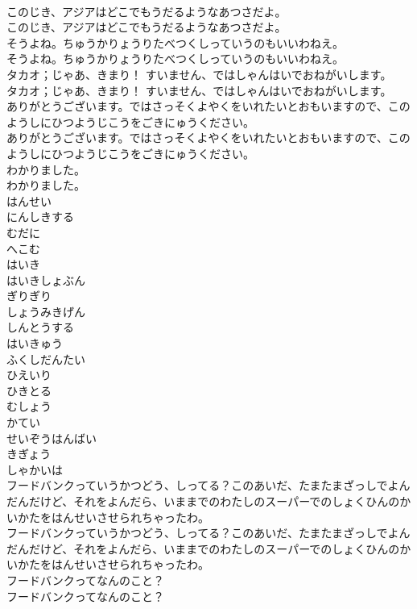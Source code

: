 \documentclass[8pt]{extreport}
\begin{document}
\begin{CJK}{UTF8}{min}
\\	このじき、アジアはどこでもうだるようなあつさだよ。	
\\	このじき、アジアはどこでもうだるようなあつさだよ。 
\\	そうよね。ちゅうかりょうりたべつくしっていうのもいいわねえ。	
\\	そうよね。ちゅうかりょうりたべつくしっていうのもいいわねえ。 
\\	タカオ；じゃあ、きまり！ すいません、ではしゃんはいでおねがいします。	
\\	タカオ；じゃあ、きまり！ すいません、ではしゃんはいでおねがいします。 
\\	ありがとうございます。ではさっそくよやくをいれたいとおもいますので、このようしにひつようじこうをごきにゅうください。	
\\	ありがとうございます。ではさっそくよやくをいれたいとおもいますので、このようしにひつようじこうをごきにゅうください。 
\\	わかりました。	
\\	わかりました。 
\\	はんせい
\\	にんしきする
\\	むだに
\\	へこむ
\\	はいき
\\	はいきしょぶん
\\	ぎりぎり
\\	しょうみきげん
\\	しんとうする
\\	はいきゅう
\\	ふくしだんたい
\\	ひえいり
\\	ひきとる
\\	むしょう
\\	かてい
\\	せいぞうはんばい
\\	きぎょう
\\	しゃかいは
\\	フードバンクっていうかつどう、しってる？このあいだ、たまたまざっしでよんだんだけど、それをよんだら、いままでのわたしのスーパーでのしょくひんのかいかたをはんせいさせられちゃったわ。	
\\	フードバンクっていうかつどう、しってる？このあいだ、たまたまざっしでよんだんだけど、それをよんだら、いままでのわたしのスーパーでのしょくひんのかいかたをはんせいさせられちゃったわ。 
\\	フードバンクってなんのこと？	
\\	フードバンクってなんのこと？ 

\end{CJK}
\end{document}
